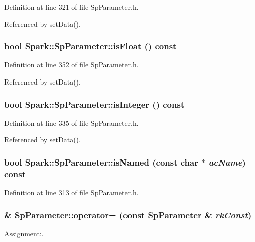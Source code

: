 Definition at line 321 of file Sp\-Parameter.h.

Referenced by set\-Data().
\subsubsection{\setlength{\rightskip}{0pt plus 5cm}bool Spark::Sp\-Parameter::is\-Float () const\hspace{0.3cm}{\tt  [inline]}}\label{classSpark_1_1SpParameter_a40}


Definition at line 352 of file Sp\-Parameter.h.

Referenced by set\-Data().
\subsubsection{\setlength{\rightskip}{0pt plus 5cm}bool Spark::Sp\-Parameter::is\-Integer () const\hspace{0.3cm}{\tt  [inline]}}\label{classSpark_1_1SpParameter_a39}


Definition at line 335 of file Sp\-Parameter.h.

Referenced by set\-Data().
\subsubsection{\setlength{\rightskip}{0pt plus 5cm}bool Spark::Sp\-Parameter::is\-Named (const char $\ast$ {\em ac\-Name}) const\hspace{0.3cm}{\tt  [inline]}}\label{classSpark_1_1SpParameter_a37}


Definition at line 313 of file Sp\-Parameter.h.
\subsubsection{ \& Sp\-Parameter::operator= (const {\bf Sp\-Parameter} \& {\em rk\-Const})}\label{classSpark_1_1SpParameter_a13}


Assignment:. 

